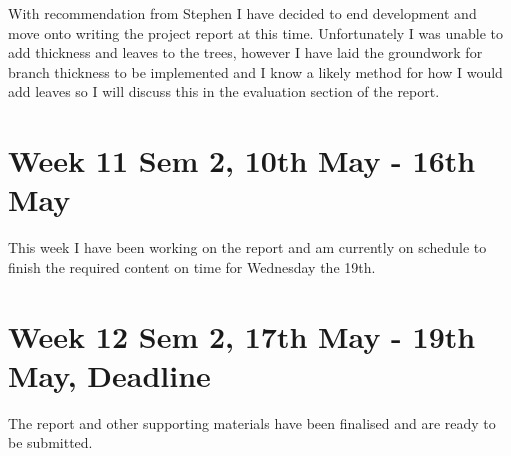 \documentclass[11pt]{article}
\begin{document}
With recommendation from Stephen I have decided to end development and move onto writing the 
project report at this time. Unfortunately I was unable to add thickness and leaves to the 
trees, however I have laid the groundwork for branch thickness to be implemented and I know 
a likely method for how I would add leaves so I will discuss this in the evaluation section of 
the report.

\section*{Week 11 Sem 2, 10th May - 16th May}
This week I have been working on the report and am currently on schedule to finish the required 
content on time for Wednesday the 19th.

\section*{Week 12 Sem 2, 17th May - 19th May, Deadline}
The report and other supporting materials have been finalised and are ready to be submitted.
\end{document}
